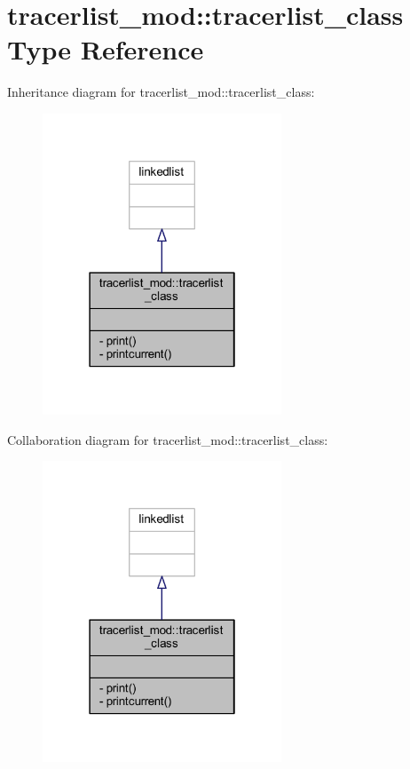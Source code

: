 \hypertarget{structtracerlist__mod_1_1tracerlist__class}{}\section{tracerlist\+\_\+mod\+:\+:tracerlist\+\_\+class Type Reference}
\label{structtracerlist__mod_1_1tracerlist__class}


Inheritance diagram for tracerlist\+\_\+mod\+:\+:tracerlist\+\_\+class\+:\nopagebreak
\begin{figure}[H]
\begin{center}
\leavevmode
\includegraphics[width=202pt]{structtracerlist__mod_1_1tracerlist__class__inherit__graph}
\end{center}
\end{figure}


Collaboration diagram for tracerlist\+\_\+mod\+:\+:tracerlist\+\_\+class\+:\nopagebreak
\begin{figure}[H]
\begin{center}
\leavevmode
\includegraphics[width=202pt]{structtracerlist__mod_1_1tracerlist__class__coll__graph}
\end{center}
\end{figure}
